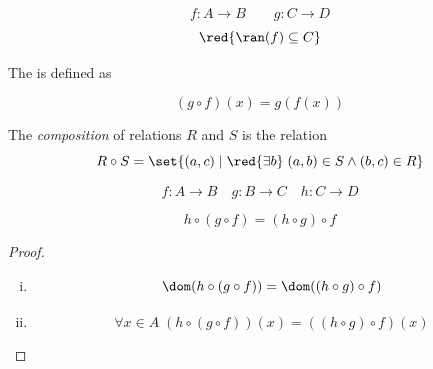 
\begin{frame}{}
  \begin{center}
  \end{center}

\end{frame}

\begin{frame}{}
  \begin{definition}[Composition]
    \[
      f: A \to B \qquad g: C \to D
    \]
    \[
      \red{\ran(f) \subseteq C}
    \]

    The   is defined as

    \[
      (g \circ f) (x) = g(f(x))
    \]
  \end{definition}

  \begin{center}
  \end{center}

  \pause
  \vspace{-0.30cm}
  \begin{definition}[Composition]
    The {\it composition} of relations $R$ and $S$ is the relation
    \[
      R \circ S = \set{(a, c) \mid \red{\exists b}\; (a, b) \in S \land (b, c) \in R}
    \]
  \end{definition}
\end{frame}

\begin{frame}{}
  \begin{theorem}
    \[
      f: A \to B \quad g: B \to C \quad h: C \to D
    \]

    \[
      h \circ (g \circ f) = (h \circ g) \circ f
    \]
  \end{theorem}

  \pause
  \vspace{0.60cm}
  \begin{proof}
    \pause
    \begin{enumerate}[(i)]
      \item
        \[
          \dom(h \circ (g \circ f)) = \dom((h \circ g) \circ f)
        \]
      \item
        \[
          \forall x \in A\; (h \circ (g \circ f))(x) = ((h \circ g) \circ f)(x)
        \]
    \end{enumerate}
  \end{proof}
\end{frame}

